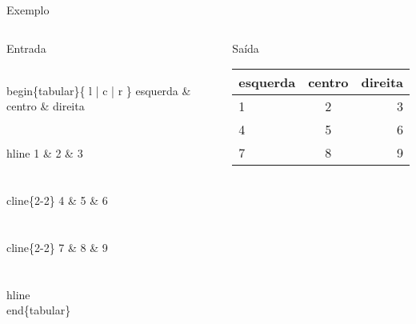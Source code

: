 \begin{frame}[fragile]{Exemplo}
    
    \begin{columns}
    \column{7cm}
    \begin{block}{Entrada}
        \begin{semiverbatim}
\footnotesize\\begin\{tabular\}\{ l | c | r \}
esquerda \& centro \& direita \\\\
\\hline
1 \& 2 \& 3 \\\\
\\cline\{2-2\}
4 \& 5 \& 6 \\\\
\\cline\{2-2\}
7 \& 8 \& 9 \\\\
\\hline
\\end\{tabular\}
\end{semiverbatim}
    \end{block}

    \begin{block}{Saída}
    \footnotesize{
        \begin{tabular}{l|c|r}
        esquerda & centro & direita \\
        \hline
        1 & 2 & 3 \\
        \cline{2-2}
        4 & 5 & 6 \\
        \cline{2-2}
        7 & 8 & 9 \\
        \hline
        \end{tabular}
    }
    \end{block}
    \end{columns}
\end{frame}

